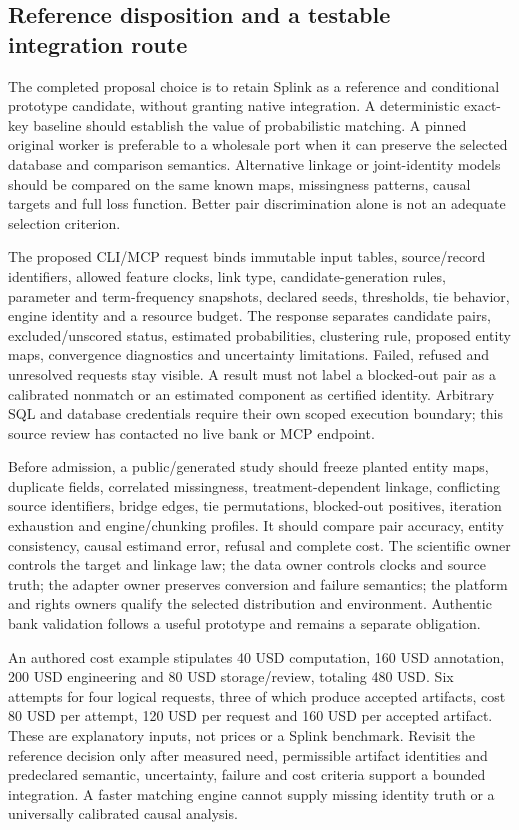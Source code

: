 \subsection{Reference disposition and a testable integration route}
The completed proposal choice is to retain Splink as a reference and conditional prototype candidate, without granting native integration. A deterministic exact-key baseline should establish the value of probabilistic matching. A pinned original worker is preferable to a wholesale port when it can preserve the selected database and comparison semantics. Alternative linkage or joint-identity models should be compared on the same known maps, missingness patterns, causal targets and full loss function. Better pair discrimination alone is not an adequate selection criterion.~\citep{exec24_splink_contract}

The proposed CLI/MCP request binds immutable input tables, source/record identifiers, allowed feature clocks, link type, candidate-generation rules, parameter and term-frequency snapshots, declared seeds, thresholds, tie behavior, engine identity and a resource budget. The response separates candidate pairs, excluded/unscored status, estimated probabilities, clustering rule, proposed entity maps, convergence diagnostics and uncertainty limitations. Failed, refused and unresolved requests stay visible. A result must not label a blocked-out pair as a calibrated nonmatch or an estimated component as certified identity. Arbitrary SQL and database credentials require their own scoped execution boundary; this source review has contacted no live bank or MCP endpoint.~\citep{exec24_splink_contract}

Before admission, a public/generated study should freeze planted entity maps, duplicate fields, correlated missingness, treatment-dependent linkage, conflicting source identifiers, bridge edges, tie permutations, blocked-out positives, iteration exhaustion and engine/chunking profiles. It should compare pair accuracy, entity consistency, causal estimand error, refusal and complete cost. The scientific owner controls the target and linkage law; the data owner controls clocks and source truth; the adapter owner preserves conversion and failure semantics; the platform and rights owners qualify the selected distribution and environment. Authentic bank validation follows a useful prototype and remains a separate obligation.~\citep{exec24_splink_contract}

An authored cost example stipulates 40 USD computation, 160 USD annotation, 200 USD engineering and 80 USD storage/review, totaling 480 USD. Six attempts for four logical requests, three of which produce accepted artifacts, cost 80 USD per attempt, 120 USD per request and 160 USD per accepted artifact. These are explanatory inputs, not prices or a Splink benchmark. Revisit the reference decision only after measured need, permissible artifact identities and predeclared semantic, uncertainty, failure and cost criteria support a bounded integration. A faster matching engine cannot supply missing identity truth or a universally calibrated causal analysis.~\citep{exec24_splink_contract}
